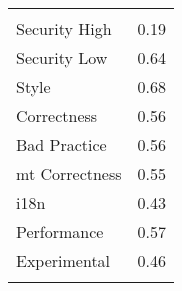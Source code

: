 
\begin{tabular}{lc}
\hline \\
Security High & 0.19\\
Security Low & 0.64\\
Style & 0.68\\
Correctness & 0.56\\
Bad Practice & 0.56\\
{\sc mt} Correctness & 0.55\\
i18n & 0.43\\
Performance & 0.57\\
Experimental & 0.46\\
\hline \\
\end{tabular}
